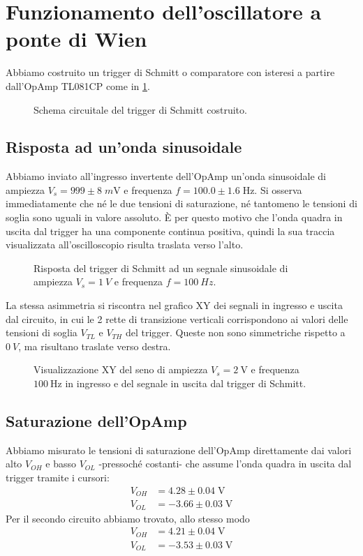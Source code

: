 \documentclass[10pt, a4paper, italian]{article}
\begin{document}
\section{Funzionamento dell'oscillatore a ponte di Wien}
Abbiamo costruito un trigger di Schmitt o comparatore con isteresi a partire
dall'OpAmp TL081CP come in \cref{fig: trgschmittschm}.
\begin{figure}[htbp]
    \centering
    \caption{Schema circuitale del trigger di Schmitt costruito.
    \label{fig: trgschmittschm}}
\end{figure}

\subsection{Risposta ad un'onda sinusoidale}
Abbiamo inviato all'ingresso invertente dell'OpAmp un'onda sinusoidale di
ampiezza $V_s = 999 \pm 8 \; \si{m\V}$ e frequenza $f = 100.0 \pm 1.6 \; \si{\Hz}$.
Si osserva immediatamente che né le due tensioni di saturazione, né tantomeno
le tensioni di soglia sono uguali in valore assoluto. \`E per questo motivo
che l'onda quadra in uscita dal trigger ha una componente continua positiva,
quindi la sua traccia visualizzata all'oscilloscopio risulta traslata verso
l'alto.
\begin{figure}[htbp]
	\centering
	\caption{Risposta del trigger di Schmitt ad un segnale sinusoidale di ampiezza
	$V_s = \SI{1}{V}$ e frequenza $f = \SI{100}{Hz}$. \label{fig: schmittsine}}
\end{figure}

La stessa asimmetria si riscontra nel grafico XY dei segnali in ingresso e
uscita dal circuito, in cui le 2 rette di transizione verticali corrispondono
ai valori delle tensioni di soglia $V_{TL}$ e $V_{TH}$ del trigger. Queste
non sono simmetriche rispetto a $\SI{0}{V}$, ma risultano traslate verso
destra.
\begin{figure}[htbp]
	\centering
	\caption{Visualizzazione XY del seno di ampiezza $V_s = \SI{2}{\V}$ e
	frequenza $\SI{100}{\Hz}$ in ingresso e del segnale in uscita dal trigger di
	Schmitt. \label{fig: schmittxy}}
\end{figure}

\subsection{Saturazione dell'OpAmp}
Abbiamo misurato le tensioni di saturazione dell'OpAmp direttamente
dai valori alto $V_{OH}$ e basso $V_{OL}$ -pressoché costanti- che assume
l'onda quadra in uscita dal trigger tramite i cursori:
\begin{align*}
V_{OH} &= 4.28 \pm 0.04 \; \si{\V} \\
V_{OL} &= -3.66 \pm 0.03 \; \si{\V}
\end{align*}
Per il secondo circuito abbiamo trovato, allo stesso modo
\begin{align*}
V_{OH} &= 4.21 \pm 0.04 \; \si{\V} \\
V_{OL} &= -3.53 \pm 0.03 \; \si{\V}
\end{align*}
\end{document}
